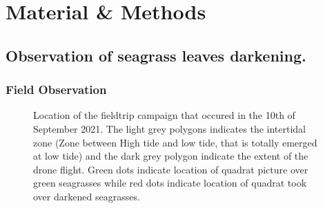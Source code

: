 \documentclass[
  number]{elsarticle}
\begin{document}
\section{Material \& Methods}\label{material-methods}

\subsection{Observation of seagrass leaves
darkening.}\label{observation-of-seagrass-leaves-darkening.}

\subsubsection{Field Observation}\label{field-observation}

\label{cell-fig-quiberonMap}
\begin{figure}[H]


\caption{\label{fig-quiberonMap}Location of the fieldtrip campaign that
occured in the 10th of September 2021. The light grey polygons indicates
the intertidal zone (Zone between High tide and low tide, that is
totally emerged at low tide) and the dark grey polygon indicate the
extent of the drone flight. Green dots indicate location of quadrat
picture over green seagrasses while red dots indicate location of
quadrat took over darkened seagrasses.}

\end{figure}%
\end{document}

